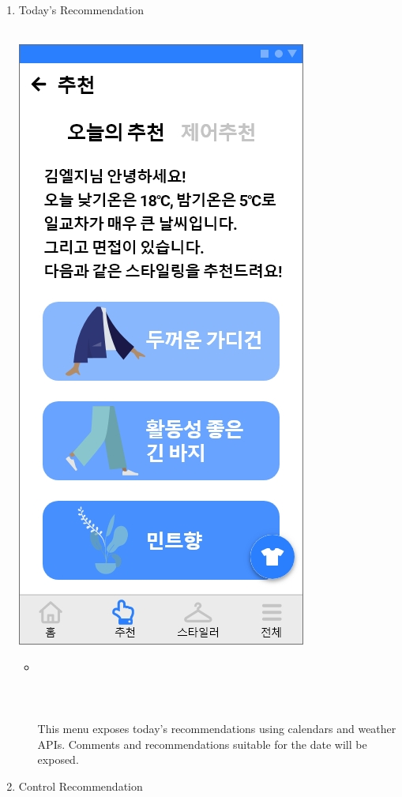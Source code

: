 \documentclass[conference]{IEEEtran}
\begin{document}
\begin{enumerate}
    \item Today's Recommendation \\ \\
        \centerline{\includegraphics[scale=0.32]{assets/추천2.jpg}}
        \begin{itemize}
            \item[] \\ \\ \\ \\ This menu exposes today's recommendations using calendars and weather APIs. Comments and recommendations suitable for the date will be exposed.\\
        \end{itemize}
    \item Control Recommendation \\ \\ \\

\end{enumerate}
\end{document}
